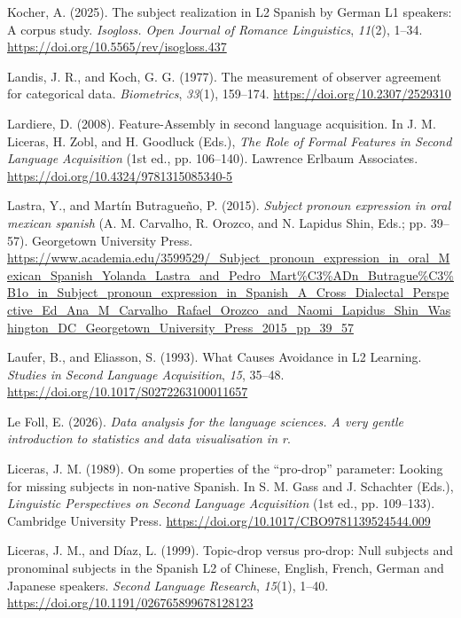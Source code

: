 \documentclass[
  letterpaper,
  DIV=11,
  numbers=noendperiod]{scrartcl}
\newlength{\cslhangindent}
\newenvironment{CSLReferences}[2] %
 {\begin{list}{}{%
  \setlength{\itemindent}{0pt}
  \setlength{\leftmargin}{0pt}
  \setlength{\parsep}{0pt}
  \ifodd #1
   \setlength{\leftmargin}{\cslhangindent}
   \setlength{\itemindent}{-1\cslhangindent}
  \fi
  \setlength{\itemsep}{#2\baselineskip}}}
 {\end{list}}
\begin{document}
\begin{CSLReferences}{1}{0}
Kocher, A. (2025). The subject realization in {L2} {Spanish} by {German}
{L1} speakers: {A} corpus study. \emph{Isogloss. Open Journal of Romance
Linguistics}, \emph{11}(2), 1--34.
\url{https://doi.org/10.5565/rev/isogloss.437}

Landis, J. R., and Koch, G. G. (1977). The measurement of observer
agreement for categorical data. \emph{Biometrics}, \emph{33}(1),
159--174. \url{https://doi.org/10.2307/2529310}

Lardiere, D. (2008). Feature-{Assembly} in second language acquisition.
In J. M. Liceras, H. Zobl, and H. Goodluck (Eds.), \emph{The {Role} of
{Formal} {Features} in {Second} {Language} {Acquisition}} (1st ed., pp.
106--140). Lawrence Erlbaum Associates.
\url{https://doi.org/10.4324/9781315085340-5}

Lastra, Y., and Martín Butragueño, P. (2015). \emph{Subject pronoun
expression in oral mexican spanish} (A. M. Carvalho, R. Orozco, and N.
Lapidus Shin, Eds.; pp. 39--57). Georgetown University Press.
\url{https://www.academia.edu/3599529/_Subject_pronoun_expression_in_oral_Mexican_Spanish_Yolanda_Lastra_and_Pedro_Mart\%C3\%ADn_Butrague\%C3\%B1o_in_Subject_pronoun_expression_in_Spanish_A_Cross_Dialectal_Perspective_Ed_Ana_M_Carvalho_Rafael_Orozco_and_Naomi_Lapidus_Shin_Washington_DC_Georgetown_University_Press_2015_pp_39_57}

Laufer, B., and Eliasson, S. (1993). What {Causes} {Avoidance} in {L2}
{Learning}. \emph{Studies in Second Language Acquisition}, \emph{15},
35--48. \url{https://doi.org/10.1017/S0272263100011657}

Le Foll, E. (2026). \emph{Data analysis for the language sciences. A
very gentle introduction to statistics and data visualisation in r}.

Liceras, J. M. (1989). On some properties of the {``pro-drop''}
parameter: Looking for missing subjects in non-native {Spanish}. In S.
M. Gass and J. Schachter (Eds.), \emph{Linguistic {Perspectives} on
{Second} {Language} {Acquisition}} (1st ed., pp. 109--133). Cambridge
University Press. \url{https://doi.org/10.1017/CBO9781139524544.009}

Liceras, J. M., and Díaz, L. (1999). Topic-drop versus pro-drop: Null
subjects and pronominal subjects in the {Spanish} {L2} of {Chinese},
{English}, {French}, {German} and {Japanese} speakers. \emph{Second
Language Research}, \emph{15}(1), 1--40.
\url{https://doi.org/10.1191/026765899678128123}


\end{CSLReferences}
\end{document}
